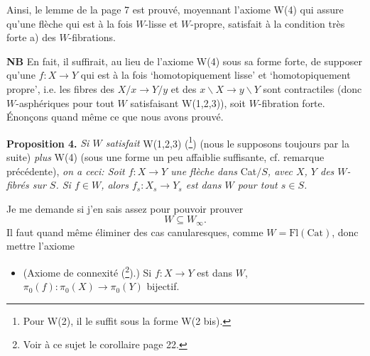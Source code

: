
Ainsi, le lemme de la page 7 est prouvé, moyennant l'axiome W(4) qui assure qu'une flèche qui est à la fois $W$-lisse et $W$-propre, satisfait à la condition très forte a) des $W$-fibrations.

\textbf{NB} En fait, il suffirait, au lieu de l'axiome W(4) sous sa forme forte, de supposer qu'une $f : X \longrightarrow Y$ qui est à la fois `homotopiquement lisse' et `homotopiquement propre', i.e. les fibres des $X/x \longrightarrow Y/y$ et des $x\backslash X \longrightarrow y\backslash Y$ sont contractiles (donc $W$-asphériques pour tout $W$ satisfaisant W(1,2,3)), soit $W$-fibration forte. Énonçons quand même ce que nous avons prouvé.

\textbf{Proposition 4.} \textit{Si $W$ satisfait} W(1,2,3) (\footnote[17]{Pour W(2), il le suffit sous la forme W(2 bis).}) (nous le supposons toujours par la suite) \textit{plus} W(4) (sous une forme un peu affaiblie suffisante, cf. remarque précédente), \textit{on a ceci: Soit $f : X \longrightarrow Y$ une flèche dans} Cat$/S$\textit{, avec $X$, $Y$ des $W$-fibrés sur $S$. Si $f \in W$, alors $f_s : X_s \longrightarrow Y_s$ est dans $W$ pour tout $s \in S$.}

Je me demande si j'en sais assez pour pouvoir prouver
\[ W \subseteq W_\infty . \]
Il faut quand même éliminer des cas canularesques, comme $W = \mathrm{Fl}(\mathrm{Cat})$, donc mettre l'axiome

\begin{itemize}[leftmargin=4em, labelwidth=3em, labelsep=0.6em]
\item[W(5)] (Axiome de connexité (\footnote[18]{Voir à ce sujet le corollaire page 22.}).) Si $f : X \longrightarrow Y$ est dans $W$, $\pi_0(f) : \pi_0(X) \longrightarrow \pi_0(Y)$ bijectif.
\end{itemize}

